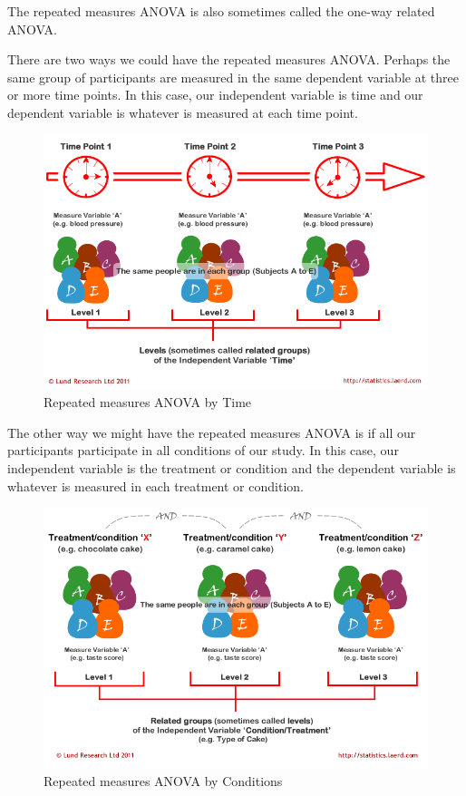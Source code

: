 \documentclass[
]{book}
\begin{document}
The repeated measures ANOVA is also sometimes called the one-way related ANOVA.

There are two ways we could have the repeated measures ANOVA. Perhaps the same group of participants are measured in the same dependent variable at three or more time points. In this case, our independent variable is time and our dependent variable is whatever is measured at each time point.

\begin{figure}

{\centering \includegraphics[width=0.8\linewidth]{images/05-repeated-measures-anova/Laerd1} 

}

\caption{Repeated measures ANOVA by Time}\label{fig:unnamed-chunk-1}
\end{figure}

The other way we might have the repeated measures ANOVA is if all our participants participate in all conditions of our study. In this case, our independent variable is the treatment or condition and the dependent variable is whatever is measured in each treatment or condition.

\begin{figure}

{\centering \includegraphics[width=0.8\linewidth]{images/05-repeated-measures-anova/Laerd2} 

}

\caption{Repeated measures ANOVA by Conditions}\label{fig:unnamed-chunk-2}
\end{figure}
\end{document}
